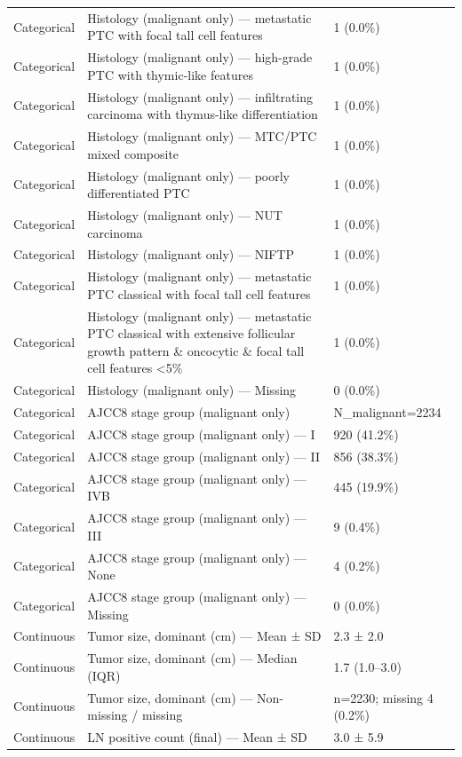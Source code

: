 \begin{table}[htbp]
\begin{tabular}{lll}
Categorical & Histology (malignant only) — metastatic PTC with focal tall cell features & 1 (0.0\%) \\
Categorical & Histology (malignant only) — high-grade PTC with thymic-like features & 1 (0.0\%) \\
Categorical & Histology (malignant only) — infiltrating carcinoma with thymus-like differentiation & 1 (0.0\%) \\
Categorical & Histology (malignant only) — MTC/PTC mixed composite & 1 (0.0\%) \\
Categorical & Histology (malignant only) — poorly differentiated PTC & 1 (0.0\%) \\
Categorical & Histology (malignant only) — NUT carcinoma & 1 (0.0\%) \\
Categorical & Histology (malignant only) — NIFTP & 1 (0.0\%) \\
Categorical & Histology (malignant only) — metastatic PTC classical with focal tall cell features & 1 (0.0\%) \\
Categorical & Histology (malignant only) — metastatic PTC classical with extensive follicular growth pattern \& oncocytic \& focal tall cell features <5\% & 1 (0.0\%) \\
Categorical & Histology (malignant only) — Missing & 0 (0.0\%) \\
Categorical & AJCC8 stage group (malignant only) & N\_malignant=2234 \\
Categorical & AJCC8 stage group (malignant only) — I & 920 (41.2\%) \\
Categorical & AJCC8 stage group (malignant only) — II & 856 (38.3\%) \\
Categorical & AJCC8 stage group (malignant only) — IVB & 445 (19.9\%) \\
Categorical & AJCC8 stage group (malignant only) — III & 9 (0.4\%) \\
Categorical & AJCC8 stage group (malignant only) — None & 4 (0.2\%) \\
Categorical & AJCC8 stage group (malignant only) — Missing & 0 (0.0\%) \\
Continuous & Tumor size, dominant (cm) — Mean ± SD & 2.3 ± 2.0 \\
Continuous & Tumor size, dominant (cm) — Median (IQR) & 1.7 (1.0–3.0) \\
Continuous & Tumor size, dominant (cm) — Non-missing / missing & n=2230; missing 4 (0.2\%) \\
Continuous & LN positive count (final) — Mean ± SD & 3.0 ± 5.9 \\

\end{tabular}
\end{table}
